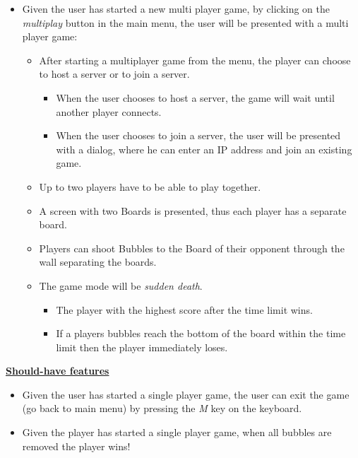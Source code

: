 \documentclass[a4paper,11pt]{article}
\begin{document}
\begin{itemize}
  \item Given the user has started a new multi player game, by clicking on the \textit{multiplay} button in the main menu, the user will be presented with a multi player game:
  \begin{itemize}
    \item After starting a multiplayer game from the menu,
          the player can choose to host a server or to join a server.
    \begin{itemize}
      \item When the user chooses to host a server, the game will wait until another player connects.
      \item When the user chooses to join a server, the user will be presented with a dialog,
            where he can enter an IP address and join an existing game.
    \end{itemize}
    \item Up to two players have to be able to play together.
    \item A screen with two Boards is presented, thus each player has a separate board.
    \item Players can shoot Bubbles to the Board of their opponent
          through the wall separating the boards.
    \item The game mode will be \textit{sudden death}.
    \begin{itemize}
      \item The player with the highest score after the time limit wins.
      \item If a players bubbles reach the bottom of the board within the time limit
            then the player immediately loses.
    \end{itemize}
  \end{itemize}
\end{itemize}

\noindent
\textbf{\underline{Should-have features}}
\begin{itemize}
   \item Given the user has started a single player game,
         the user can exit the game (go back to main menu) by pressing
         the \textit{M} key on the keyboard.
   \item Given the player has started a single player game,
         when all bubbles are removed the player wins!
\end{itemize}
\end{document}
